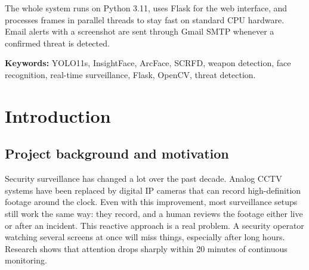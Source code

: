 \documentclass[12pt,a4paper]{report}
\begin{document}
The whole system runs on Python 3.11, uses Flask for the web interface, and processes frames in parallel threads to stay fast on standard CPU hardware. Email alerts with a screenshot are sent through Gmail SMTP whenever a confirmed threat is detected.

\vspace{0.3cm}
\noindent\textbf{Keywords:} YOLO11s, InsightFace, ArcFace, SCRFD, weapon detection, face recognition, real-time surveillance, Flask, OpenCV, threat detection.

\newpage

\tableofcontents
\newpage

\listoffigures
{}
\newpage

\listoftables
{}
\newpage

\setcounter{page}{1}


\chapter{Introduction}

\section{Project background and motivation}

Security surveillance has changed a lot over the past decade. Analog CCTV systems have been replaced by digital IP cameras that can record high-definition footage around the clock. Even with this improvement, most surveillance setups still work the same way: they record, and a human reviews the footage either live or after an incident. This reactive approach is a real problem. A security operator watching several screens at once will miss things, especially after long hours. Research shows that attention drops sharply within 20 minutes of continuous monitoring.
\end{document}

